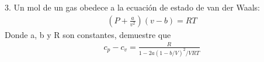 3. Un mol de un gas obedece a la ecuación de estado de van der Waals:
\begin{align*}
\left(P+\frac{a}{v^2}\right)(v-b)=R T    
\end{align*}
Donde a, b y R son constantes, demuestre que
\begin{align*}
    c_p-c_v=\frac{R}{1-2 a(1-b / V)^2 / V R T}
\end{align*}
